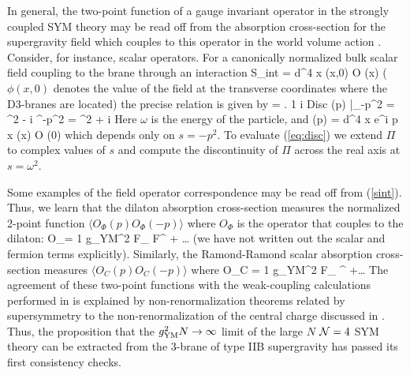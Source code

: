 \documentclass[12pt]{article}
\begin{document}
In general, the two-point function of a gauge invariant operator in
the strongly coupled SYM theory may be read off from the
absorption cross-section for the supergravity field which
couples to this operator in the world volume action \cite{gkThree,KTV}.
Consider, for instance, scalar operators.
For a canonically normalized bulk scalar field coupling to the
brane through an interaction
\be
S_{\rm int} = \int d^4 x \phi (x,0) {\cal O} (x)
\ee
($\phi(x,0)$ denotes the value of the field at the transverse
coordinates where the D3-branes are located)
the precise relation is given by
\be
\label{eq:disc}
\sigma = \left. {1  i \omega}  {\rm Disc}\; \Pi (p) \right|_{-p^2
=
\omega^2 - i \epsilon}^{-p^2 = \omega^2 + i \epsilon}
\ee
Here $\omega$ is the energy of the particle, and
\be
\Pi(p) = \int d^4 x e^{i p \cdot x} (x) {\cal O} (0)
\rangle
\ee
which depends only on $s=-p^2$. To evaluate (\ref{eq:disc}) we extend
$\Pi$ to  complex values of $s$ and compute the discontinuity of $\Pi$
across the real axis at $s=\omega^2$.

Some examples of the field operator correspondence may
be read off from (\ref{sint}). Thus, we learn that the dilaton
absorption cross-section measures the normalized 2-point function
$\langle O_\Phi  (p) O_\Phi (-p) \rangle$ where $O_\Phi$
is the operator that couples to the dilaton: 
\be
O_\Phi = {1 g_{\rm YM}^2 }\tr F_{\alpha\beta} F^{\alpha\beta} + \ldots 
\ee
(we have not written out the scalar and fermion terms explicitly).
Similarly,
the Ramond-Ramond scalar absorption cross-section measures  
$\langle O_C  (p) O_C (-p) \rangle$ where 
\be
O_C = 
{1 g_{\rm YM}^2 }\tr F_{\alpha\beta} ^{\alpha\beta} 
+\ldots \ee
The agreement of these two-point functions
with the weak-coupling calculations performed in
\cite{kleb,gukt} is explained by non-renormalization
theorems related by supersymmetry to the
non-renormalization of the central charge discussed in
\cite{gkThree}. 
Thus, the proposition that the $g_{\rm YM}^2 N\rightarrow
\infty$ limit of the large $N$ ${\cal N}=4$ SYM theory can be extracted from 
the 3-brane of type IIB supergravity has passed its first consistency checks.
\end{document}
